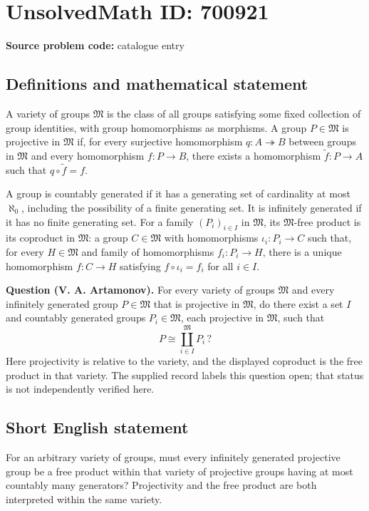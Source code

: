 \documentclass[11pt]{article}
\begin{document}
\section*{UnsolvedMath ID: 700921}
\textbf{Source problem code:} catalogue entry
\subsection{Definitions and mathematical statement}
A variety of groups \(\mathfrak M\) is the class of all groups satisfying some fixed collection of group identities, with group homomorphisms as morphisms. A group \(P\in\mathfrak M\) is projective in \(\mathfrak M\) if, for every surjective homomorphism \(q:A\twoheadrightarrow B\) between groups in \(\mathfrak M\) and every homomorphism \(f:P\to B\), there exists a homomorphism \(\widetilde f:P\to A\) such that \(q\circ\widetilde f=f\).

A group is countably generated if it has a generating set of cardinality at most \(\aleph_0\), including the possibility of a finite generating set. It is infinitely generated if it has no finite generating set. For a family \((P_i)_{i\in I}\) in \(\mathfrak M\), its \(\mathfrak M\)-free product is its coproduct in \(\mathfrak M\): a group \(C\in\mathfrak M\) with homomorphisms \(\iota_i:P_i\to C\) such that, for every \(H\in\mathfrak M\) and family of homomorphisms \(f_i:P_i\to H\), there is a unique homomorphism \(f:C\to H\) satisfying \(f\circ\iota_i=f_i\) for all \(i\in I\).

\textbf{Question (V. A. Artamonov).} For every variety of groups \(\mathfrak M\) and every infinitely generated group \(P\in\mathfrak M\) that is projective in \(\mathfrak M\), do there exist a set \(I\) and countably generated groups \(P_i\in\mathfrak M\), each projective in \(\mathfrak M\), such that
\[
P\cong\coprod_{i\in I}^{\mathfrak M}P_i\,?
\]
Here projectivity is relative to the variety, and the displayed coproduct is the free product in that variety. The supplied record labels this question open; that status is not independently verified here.
\subsection{Short English statement}
For an arbitrary variety of groups, must every infinitely generated projective group be a free product within that variety of projective groups having at most countably many generators? Projectivity and the free product are both interpreted within the same variety.
\end{document}
